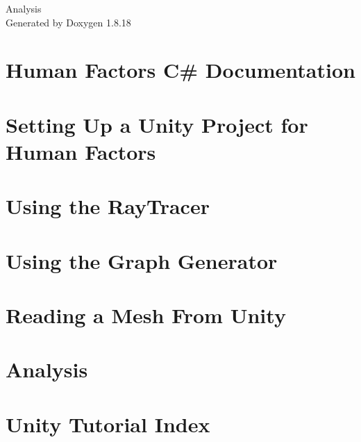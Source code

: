 \let\mypdfximage\pdfximage\def\pdfximage{\immediate\mypdfximage}\documentclass[twoside]{book}
\newcommand{\+}{\discretionary{\mbox{\scriptsize$\hookleftarrow$}}{}{}}
\newcommand{\clearemptydoublepage}{%
  \newpage{\pagestyle{empty}\cleardoublepage}%
}
\begin{document}
\hypersetup{pageanchor=false,
             bookmarksnumbered=true,
             pdfencoding=unicode
            }
\begin{titlepage}
\vspace*{7cm}
\begin{center}%
{\Large Analysis }\\
\vspace*{1cm}
{\large Generated by Doxygen 1.8.18}\\
\end{center}
\end{titlepage}
\clearemptydoublepage
{}
\tableofcontents
\clearemptydoublepage
{}
\hypersetup{pageanchor=true}

\chapter{Human Factors C\# Documentation}
\label{index}\hypertarget{index}{}
\chapter{Setting Up a Unity Project for Human Factors}
\label{_unity_project_setup}

\chapter{Using the Ray\+Tracer}
\label{_using_the_raytracer}

\chapter{Using the Graph Generator}
\label{_generating_a_graph}

\chapter{Reading a Mesh From Unity}
\label{_mesh_from_unity}

\chapter{Analysis}
\label{md_src__csharp_docs_markdown_mainpage}

\chapter{Unity Tutorial Index}
\label{_unity_tutorials}

\end{document}
